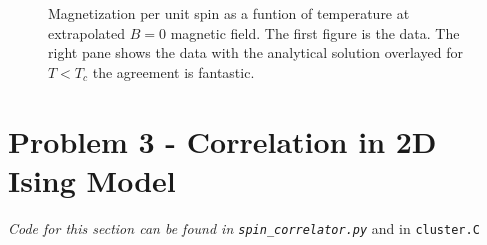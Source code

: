 \documentclass[singlepage,notitlepage,nofootinbib,11pt]{revtex4-1}
\begin{document}
\begin{figure}[h]
  \centering
  \captionsetup[subfigure]{labelformat=empty}
  \caption{\label{merit} Magnetization per unit spin as a funtion of temperature at extrapolated $B=0$ magnetic field. The first figure is the data. The right pane shows the data with the analytical solution overlayed for $T<T_c$ the agreement is fantastic.}
\end{figure}
\clearpage
\section{Problem 3 - Correlation in 2D Ising Model}
\begin{center}{\it Code for this section can be found in \verb|spin_correlator.py|} and in \verb|cluster.C|\end{center}
\end{document}
